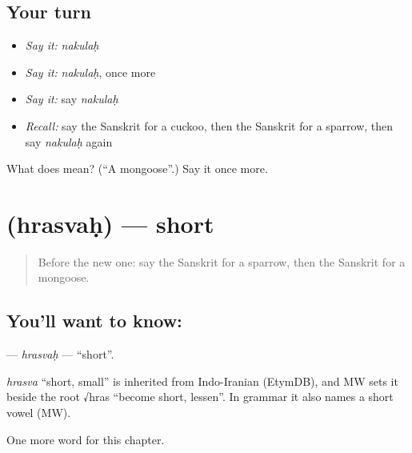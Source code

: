 \subsection*{Your turn}
\begin{itemize}
\raggedright
  \item \emph{Say it:} \emph{nakulaḥ}
  \item \emph{Say it:} \emph{nakulaḥ}, once more
  \item \emph{Say it:} say \emph{nakulaḥ}
  \item \emph{Recall:} say the Sanskrit for a cuckoo, then the Sanskrit for a sparrow, then say \emph{nakulaḥ} again
\end{itemize}

\begin{tcolorbox}[breakable,colback=teal!4,colframe=teal!35!black,title={Before you move on}]
What does  mean? (\textquotedblleft{}A mongoose\textquotedblright{}.) Say it once more.
\end{tcolorbox}
\section[\texorpdfstring{\sk{ह्रस्वः} (hrasvaḥ)}{ह्रस्वः (hrasvaḥ)}]{ (hrasvaḥ) — short}

\label{lesson:SA-C125-hrasvah}



\begin{quote}
Before the new one: say the Sanskrit for a sparrow, then the Sanskrit for a mongoose.
\end{quote}

\subsection*{You'll want to know: }
\textbf{} — \emph{hrasvaḥ} — \textquotedblleft{}short\textquotedblright{}.

\begin{cousinweb}
\emph{hrasva} \textquotedblleft{}short, small\textquotedblright{} is inherited from Indo-Iranian (EtymDB), and MW sets it beside the root √hras \textquotedblleft{}become short, lessen\textquotedblright{}. In grammar it also names a short vowel (MW).
\end{cousinweb}

\begin{grammarlens}[title={What you've built}]
One more word for this chapter.
\end{grammarlens}

